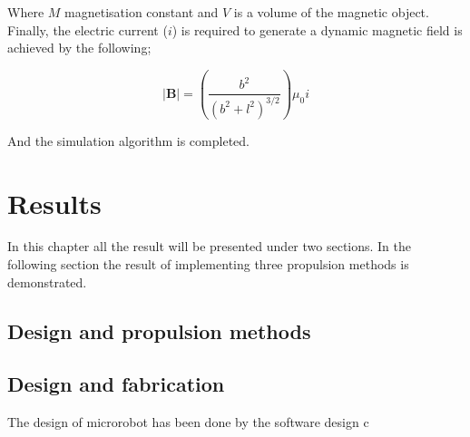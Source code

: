 \documentclass[12pt,a4paper,titlepage]{report}
\begin{document}
Where $M$ magnetisation constant and $V$ is a volume of the magnetic object. Finally, the electric current 
($i$) is required to generate a dynamic magnetic field is achieved by the following; 


\begin{equation}
|\bm{B}| = (\frac{b^2}{(b^2+l^2)^{3/2}}){\mu}_0 i
\label{Current}  
\end{equation}


And the simulation algorithm is completed.

\chapter{Results}\label{result}
In this chapter all the result will be presented under two sections. In the following section the result of implementing
three propulsion methods is demonstrated.


\section{Design and propulsion methods}

\section{Design and fabrication}

The design of microrobot has been done by the software design c
\end{document}
